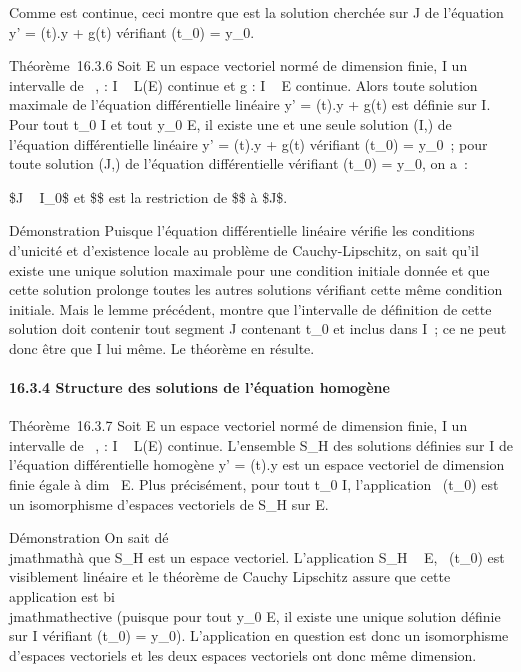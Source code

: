 \documentclass[]{article}
\begin{document}
Comme \phi est continue, ceci montre que \phi est la solution cherchée sur J
de l'équation y' = \ell(t).y + g(t) vérifiant \phi(t_0) =
y_0.

Théorème~16.3.6 Soit E un espace vectoriel normé de dimension finie, I
un intervalle de ~, \ell : I \rightarrow~ L(E) continue et g : I \rightarrow~ E continue. Alors
toute solution maximale de l'équation différentielle linéaire y' =
\ell(t).y + g(t) est définie sur I. Pour tout t_0 \in I et tout
y_0 \in E, il existe une et une seule solution (I,\phi) de
l'équation différentielle linéaire y' = \ell(t).y + g(t) vérifiant
\phi(t_0) = y_0~; pour toute solution (J,\psi) de l'équation
différentielle vérifiant \psi(t_0) = y_0, on a~:

\text\$J \subset~ I_0\$ et \$\psi\$ est la restriction
de \$\phi\$ à \$J\$.

Démonstration Puisque l'équation différentielle linéaire vérifie les
conditions d'unicité et d'existence locale au problème de
Cauchy-Lipschitz, on sait qu'il existe une unique solution maximale pour
une condition initiale donnée et que cette solution prolonge toutes les
autres solutions vérifiant cette même condition initiale. Mais le lemme
précédent, montre que l'intervalle de définition de cette solution doit
contenir tout segment J contenant t_0 et inclus dans I~; ce ne
peut donc être que I lui même. Le théorème en résulte.

\paragraph{16.3.4 Structure des solutions de l'équation homogène}

Théorème~16.3.7 Soit E un espace vectoriel normé de dimension finie, I
un intervalle de ~, \ell : I \rightarrow~ L(E) continue. L'ensemble S_H des
solutions définies sur I de l'équation différentielle homogène y' =
\ell(t).y est un espace vectoriel de dimension finie égale à
dim~ E. Plus précisément, pour tout
t_0 \in I, l'application
\phi\mapsto~\phi(t_0) est un isomorphisme
d'espaces vectoriels de S_H sur E.

Démonstration On sait dé\\jmathmathà que S_H est un espace vectoriel.
L'application S_H \rightarrow~ E,
\phi\mapsto~\phi(t_0) est visiblement linéaire et
le théorème de Cauchy Lipschitz assure que cette application est
bi\\jmathmathective (puisque pour tout y_0 \in E, il existe une unique
solution définie sur I vérifiant \phi(t_0) = y_0).
L'application en question est donc un isomorphisme d'espaces vectoriels
et les deux espaces vectoriels ont donc même dimension.
\end{document}
